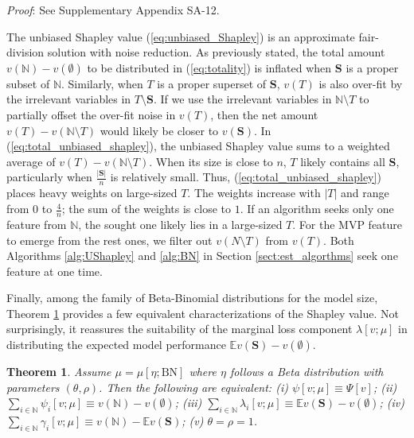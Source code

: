 \documentclass[a4paper,12pt]{article}
\newtheorem{theorem}{Theorem}
\begin{document}
\noindent \textit{Proof}: See Supplementary Appendix SA-12.


The unbiased Shapley value (\ref{eq:unbiased_Shapley}) is an approximate fair-division solution with noise reduction.
As previously stated, the total amount $v(\mathbb{N})-v(\emptyset)$ to be distributed in (\ref{eq:totality}) is inflated when $\mathbf{S}$ is a proper subset of $\mathbb{N}$. 
Similarly, when $T$ is a proper superset of $\mathbf{S}$, $v(T)$ is also over-fit by the irrelevant variables in $T\setminus \mathbf{S}$. 
If we use the irrelevant variables in $\mathbb{N} \setminus T$ to partially offset the over-fit noise in $v(T)$, 
then the net amount $v(T) - v(\mathbb{N} \setminus T)$ would likely be closer to $v(\mathbf{S})$. 
In (\ref{eq:total_unbiased_shapley}), the unbiased Shapley value sums to a weighted average of $v(T) - v(\mathbb{N} \setminus T)$.
When its size is close to $n$, $T$ likely contains all $\mathbf{S}$, particularly when $\frac{|\mathbf{S}|}{n}$ is relatively small. 
Thus, (\ref{eq:total_unbiased_shapley}) places heavy weights on large-sized $T$.
The weights increase with $|T|$ and range from $0$ to $\frac{4}{n}$; the sum of the weights is close to $1$.
If an algorithm seeks only one feature from $\mathbb{N}$, the sought one likely lies in a large-sized $T$. 
For the MVP feature to emerge from the rest ones, we filter out $v(N\setminus T)$ from $v(T)$.
Both Algorithms \ref{alg:UShapley} and \ref{alg:BN} in Section \ref{sect:est_algorthms}  seek one feature at one time.


Finally, among the family of  Beta-Binomial distributions for the model size, 
Theorem \ref{thm:ShapleyValue} provides a few equivalent characterizations of the Shapley value. Not surprisingly, 
it reassures the suitability of the marginal loss component $\lambda[v;\mu]$ in distributing the expected model performance $\mathbb{E} v(\mathbf{S}) - v(\emptyset)$.


\begin{theorem} \label{thm:ShapleyValue}
Assume $\mu = \mu[\eta; \mathrm{BN}]$ where $\eta$ follows a Beta distribution with
parameters $(\theta,\rho)$. Then
the following are equivalent:
(i)  $\psi [v;\mu] \equiv \Psi [v]$;
(ii)  $\sum\limits_{i\in \mathbb{N}}  \psi_i[v; \mu] \equiv v(\mathbb{N}) - v(\emptyset)$;
(iii) $\sum\limits_{i\in \mathbb{N}}  \lambda_i [v;\mu] \equiv \mathbb{E} v(\mathbf{S}) - v(\emptyset)$;
(iv) $\sum\limits_{i\in \mathbb{N}}  \gamma_i [v;\mu] \equiv v(\mathbb{N}) - \mathbb{E} v(\mathbf{S})$;
(v)  $\theta=\rho=1$.
\end{theorem}
\end{document}
